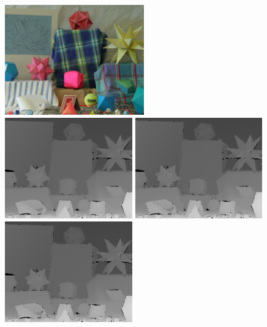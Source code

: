 \begin{figure}[t]
\begin{minipage}[b]{1\linewidth}
  \centering
  \centerline{\includegraphics[width=6cm]{depth_interp/quan_nhf_moebius/Moebius.png}}
\end{minipage}
\hfill
\begin{minipage}[b]{0.48\linewidth}
  \centering
  \centerline{\includegraphics[width=5.5cm]{depth_interp/quan_nhf_moebius/gt.png}}
\end{minipage}
\hfill
\begin{minipage}[b]{0.48\linewidth}
  \centering
  \centerline{\includegraphics[width=5.5cm]{depth_interp/quan_nhf_moebius/bl.png}}
\end{minipage}
%
\hfill
\begin{minipage}[b]{0.48\linewidth}
  \centering
  \centerline{\includegraphics[width=5.5cm]{depth_interp/quan_nhf_moebius/bc.png}}

\end{minipage}
\end{figure}
